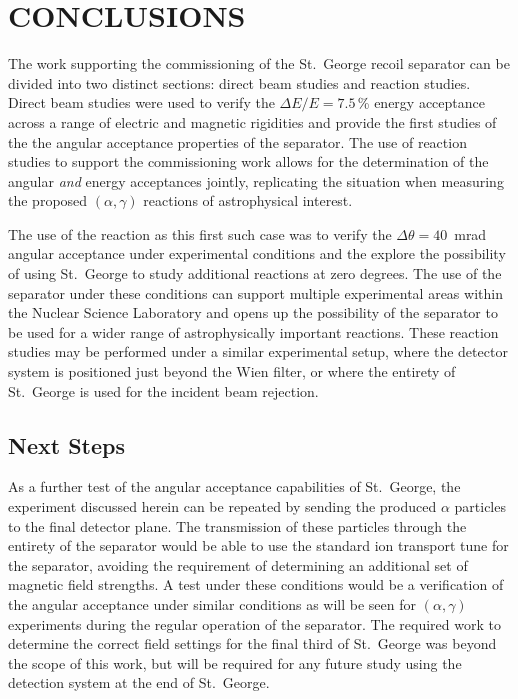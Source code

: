 
\chapter{CONCLUSIONS}
\label{ch:conclusions}

The work supporting the commissioning of the St.\ George recoil
separator can be divided into two distinct sections: direct beam studies
and reaction studies. Direct beam studies were used to verify the
$\Delta E/E = 7.5$\,\% energy acceptance across a range of electric and
magnetic rigidities and provide the first studies of the the angular
acceptance properties of the separator. The use of reaction studies to
support the commissioning work allows for the determination of the
angular \textit{and} energy acceptances jointly, replicating the
situation when measuring the proposed $(\alpha,\gamma)$ reactions of
astrophysical interest.

The use of the \alpa{} reaction as this first such case was to verify
the $\Delta\theta = 40$~mrad angular acceptance under experimental
conditions and the explore the possibility of using St.\ George to
study additional reactions at zero degrees. The use of the separator
under these conditions can support multiple experimental areas within
the Nuclear Science Laboratory and opens up the possibility of the
separator to be used for a wider range of astrophysically important
reactions. These reaction studies may be performed under a similar
experimental setup, where the detector system is positioned just beyond
the Wien filter, or where the entirety of St.\ George is used for the
incident beam rejection.

\section{Next Steps}
\label{sec:next-steps}

As a further test of the angular acceptance capabilities of St.\ George,
the experiment discussed herein can be repeated by sending the produced
$\alpha$ particles to the final detector plane. The transmission of
these particles through the entirety of the separator would be able to
use the standard ion transport tune for the separator, avoiding the
requirement of determining an additional set of magnetic field
strengths. A test under these conditions would be a verification of the
angular acceptance under similar conditions as will be seen for
$(\alpha,\gamma)$ experiments during the regular operation of the
separator. The required work to determine the correct field settings for
the final third of St.\ George was beyond the scope of this work, but
will be required for any future study using the detection system at the
end of St.\ George.

